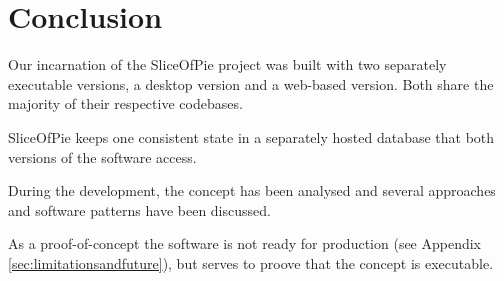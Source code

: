 \section{Conclusion}

Our incarnation of the SliceOfPie project was built with two separately executable versions, a desktop version
and a web-based version. Both share the majority of their respective codebases.

SliceOfPie keeps one consistent state in a separately hosted database that both versions of the software access.

During the development, the concept has been analysed and several approaches and software patterns have been
discussed.

As a proof-of-concept the software is not ready for production (see Appendix \ref{sec:limitationsandfuture}), but
serves to proove that the concept is executable.